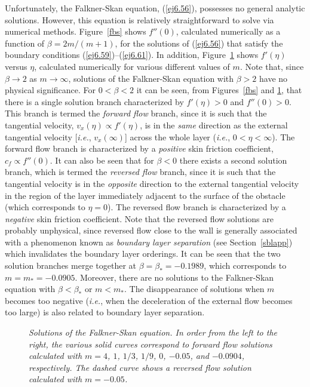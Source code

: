 Unfortunately, the Falkner-Skan equation, (\ref{ej6.56}),  possesses no general analytic solutions. However, this equation is relatively straightforward to solve via numerical methods. 
Figure~\ref{fbs} shows $f''(0)$, calculated numerically as a function of $\beta=2m/(m+1)$, for  the solutions of (\ref{ej6.56}) that
satisfy the boundary conditions (\ref{ej6.59})--(\ref{ej6.61}). In addition, Figure~\ref{ffs} shows $f'(\eta)$ versus $\eta$, calculated numerically
for various different  values of $m$.
Note that, since $\beta\rightarrow 2$ as $m\rightarrow \infty$, solutions of the Falkner-Skan equation with
$\beta>2$ have no physical significance. For $0<\beta<2$ it can be seen, from Figures~\ref{fbs} and \ref{ffs}, that there is a single
solution branch characterized by $f'(\eta)>0$ and $f''(0)>0$. This branch is termed the {\em forward flow}\/  branch, since it
is such that the tangential velocity, $v_x(\eta)\propto f'(\eta)$,  is in the {\em same}\/ direction as the
external tangential velocity [{\em i.e.}, $v_x(\infty)$] across the whole layer ({\em i.e.}, $0<\eta<\infty$). 
The forward flow branch is  characterized by a {\em positive}\/ skin friction coefficient, $c_f\propto f''(0)$. 
It can also be seen that for $\beta<0$ there exists a second solution branch, which is termed the {\em reversed flow}\/
branch, since it is such that the tangential velocity is in the {\em opposite}\/ direction to the
external tangential velocity in the  region of the layer immediately adjacent to the  surface of the obstacle (which corresponds to $\eta=0$).
The reversed flow branch is characterized by a {\em negative}\/  skin friction coefficient. Note that the reversed flow
solutions are probably unphysical, since reversed flow close to the wall is generally associated
with a phenomenon known as {\em boundary layer
separation}\/ (see Section~\ref{sblapp}) which invalidates the boundary layer orderings.
It can be seen that the two
solution branches merge together at $\beta=\beta_\ast=-0.1989$,
which corresponds to $m=m_\ast = -0.0905$. Moreover,  there are no solutions to the Falkner-Skan equation with $\beta<\beta_\ast$ or $m<m_\ast$. 
 The disappearance  of solutions when $m$ becomes too negative ({\em i.e.}, when the deceleration of the
 external flow becomes too large) is also related to boundary layer separation. 
 
\begin{figure}
\epsfysize=3.25in
\centerline{}
\caption{\em Solutions of the Falkner-Skan equation. In order from the left to the right, the various solid curves correspond to forward flow solutions calculated with $m=4$, $1$, $1/3$, $1/9$, $0$,
$-0.05$, and $-0.0904$, respectively. The dashed curve shows a reversed flow solution calculated with $m=-0.05$. }\label{ffs}
\end{figure}

